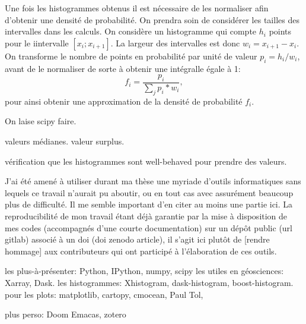 \documentclass[index]{subfiles}
\begin{document}
Une fois les histogrammes obtenus il est nécessaire de les normaliser afin d'obtenir une densité de probabilité. On prendra soin de considérer les tailles des intervalles dans les calculs.
On considère un histogramme qui compte \(h_{i}\) points pour le i\ieme intervalle \(\left[x_{i}; x_{i+1} \right]\).
La largeur des intervalles est donc \(w_{i} = x_{i+1}-x_{i}\). On transforme le nombre de points en probabilité par unité de valeur \(p_{i} = h_{i} / w_{i} \), avant de le normaliser de sorte à obtenir une intégralle égale à 1:
\begin{equation}
  f_{i} = \frac{p_{i}}{\sum_{j}{p_{i}*w_{i}}},
\end{equation}
pour ainsi obtenir une approximation de la densité de probabilité \(f_{i}\).

On laise scipy faire.

valeurs médianes.
valeur surplus.

vérification que les histogrammes sont well-behaved pour prendre des valeurs.

\label{sec:ref-info}

J'ai été amené à utiliser durant ma thèse une myriade d'outils informatiques sans lequels ce travail n'aurait pu aboutir, ou en tout cas avec assurément beaucoup plus de difficulté.
Il me semble important d'en citer au moins une partie ici.
La reproducibilité de mon travail étant déjà garantie par la mise à disposition de mes codes (accompagnés d'une courte documentation) sur un dépôt public (url gitlab) associé à un doi (doi zenodo article), il s'agit ici plutôt de [rendre hommage] aux contributeurs qui ont participé à l'élaboration de ces outils.

les plus-à-présenter: Python, IPython, numpy, scipy
les utiles en géosciences: Xarray, Dask.
les histogrammes: Xhistogram, dask-histogram, boost-histogram.
pour les plots: matplotlib, cartopy, cmocean, Paul Tol,

plus perso: Doom Emacas, zotero

\end{document}
